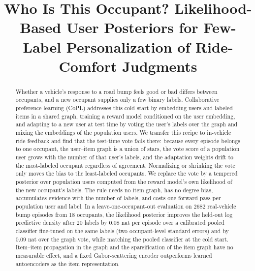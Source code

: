 \documentclass[conference]{IEEEtran}
\newif\ifdraftnotes
\newcommand{\draftnote}[1]{\ifdraftnotes\textcolor{red}{\textbf{[TODO: #1]}}\fi}
\begin{document}
\title{Who Is This Occupant? Likelihood-Based User Posteriors for Few-Label Personalization of Ride-Comfort Judgments\\
\draftnote{Alternative titles in claude\_notes/04, Sec.~1; choose one.}}

\author{
\IEEEauthorblockA{\draftnote{Affiliations, e-mail addresses, corresponding author, funding.}}}

\maketitle

\begin{abstract}
Whether a vehicle's response to a road bump feels good or bad differs between occupants, and a new occupant supplies only a few binary labels. Collaborative preference learning (CoPL) addresses this cold start by embedding users and labeled items in a shared graph, training a reward model conditioned on the user embedding, and adapting to a new user at test time by voting the user's labels over the graph and mixing the embeddings of the population users. We transfer this recipe to in-vehicle ride feedback and find that the test-time vote fails there: because every episode belongs to one occupant, the user--item graph is a union of stars, the vote score of a population user grows with the number of that user's labels, and the adaptation weights drift to the most-labeled occupant regardless of agreement. Normalizing or shrinking the vote only moves the bias to the least-labeled occupants. We replace the vote by a tempered posterior over population users computed from the reward model's own likelihood of the new occupant's labels. The rule needs no item graph, has no degree bias, accumulates evidence with the number of labels, and costs one forward pass per population user and label. In a leave-one-occupant-out evaluation on 2682 real-vehicle bump episodes from 18 occupants, the likelihood posterior improves the held-out log predictive density after 20 labels by 0.08 nat per episode over a calibrated pooled classifier fine-tuned on the same labels (two occupant-level standard errors) and by 0.09 nat over the graph vote, while matching the pooled classifier at the cold start. Item--item propagation in the graph and the sparsification of the item graph have no measurable effect, and a fixed Gabor-scattering encoder outperforms learned autoencoders as the item representation.
\end{abstract}
\end{document}
